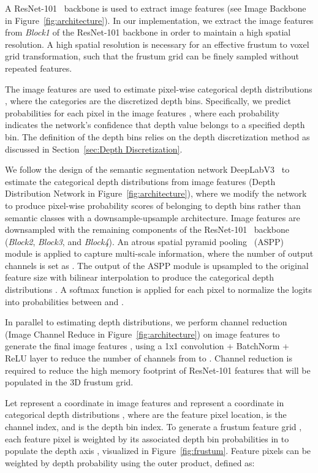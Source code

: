 \documentclass[final]{cvpr}
\begin{document}
A ResNet-101~\cite{ResNet} backbone is used to extract image features  (see Image Backbone in Figure~\ref{fig:architecture}). In our implementation, we extract the image features from \textit{Block1} of the ResNet-101 backbone in order to maintain a high spatial resolution. A high spatial resolution is necessary for an effective frustum to voxel grid transformation, such that the frustum grid can be finely sampled without repeated features.

The image features  are used to estimate pixel-wise categorical depth distributions , where the categories are the  discretized depth bins. Specifically, we predict  probabilities for each pixel in the image features , where each probability indicates the network's confidence that depth value belongs to a specified depth bin. The definition of the depth bins relies on the depth discretization method as discussed in Section~\ref{sec:Depth Discretization}.

We follow the design of the semantic segmentation network DeepLabV3~\cite{DeepLabV3} to estimate the categorical depth distributions from image features  (Depth Distribution Network in Figure~\ref{fig:architecture}), where we modify the network to produce pixel-wise probability scores of belonging to depth bins rather than semantic classes with a downsample-upsample architecture. Image features  are downsampled with the remaining components of the ResNet-101~\cite{ResNet} backbone (\textit{Block2}, \textit{Block3}, and \textit{Block4}). An atrous spatial pyramid pooling~\cite{DeepLabV3} (ASPP) module is applied to capture multi-scale information, where the number of output channels is set as . The output of the ASPP module is upsampled to the original feature size with bilinear interpolation to produce the categorical depth distributions . A softmax function is applied for each pixel to normalize the  logits into probabilities between  and .

In parallel to estimating depth distributions, we perform channel reduction (Image Channel Reduce in Figure~\ref{fig:architecture}) on image features   to generate the final image features , using a 1x1 convolution + BatchNorm + ReLU layer to reduce the number of channels from  to . Channel reduction is required to reduce the high memory footprint of ResNet-101 features that will be populated in the 3D frustum grid.

Let  represent a coordinate in image features  and  represent a coordinate in categorical depth distributions , where  are the feature pixel location,  is the channel index, and  is the depth bin index. To generate a frustum feature grid , each feature pixel  is weighted by its associated depth bin probabilities in  to populate the depth axis , visualized in Figure~\ref{fig:frustum}. Feature pixels can be weighted by depth probability using the outer product, defined as:
\end{document}
